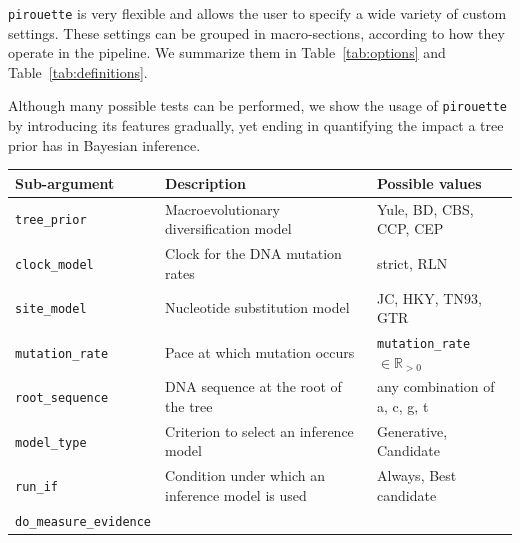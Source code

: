 \verb;pirouette; is very flexible and allows the user 
to specify a wide variety of custom settings. 
These settings can be grouped in macro-sections, 
according to how they operate in the pipeline. 
We summarize them in Table~\ref{tab:options} and Table~\ref{tab:definitions}.

Although many possible tests can be performed, 
we show the usage of \verb;pirouette; by introducing 
its features gradually, yet ending in quantifying the impact a tree prior has
in Bayesian inference.

\begin{table}
\centering
  \begin{tabular}{|p{3.4cm}|p{9.7cm}|p{4.5cm}@{}|}
    \hline
    \centering
    \textbf{Sub-argument} & 
    \textbf{Description} &
    \textbf{Possible values} \\ 
    \hline
    \verb;tree_prior; &
    Macroevolutionary diversification model &
    Yule, BD, CBS, CCP, CEP \\
    \verb;clock_model; &
    Clock for the DNA mutation rates &
    strict, RLN \\
    \verb;site_model; &
    Nucleotide substitution model &
    JC, HKY, TN93, GTR \\
    \verb;mutation_rate; &
    Pace at which mutation occurs &
    \verb;mutation_rate; $\in \mathbb{R}_{>0}$\\
    \verb;root_sequence; &
    DNA sequence at the root of the tree &
    any combination of a, c, g, t \\
    \verb;model_type; &
    Criterion to select an inference model &
    Generative, Candidate \\
    \verb;run_if; &
    Condition under which an inference model is used &
    Always, Best candidate \\
    \verb;do_measure_evidence; &

\end{tabular}
\end{table}
